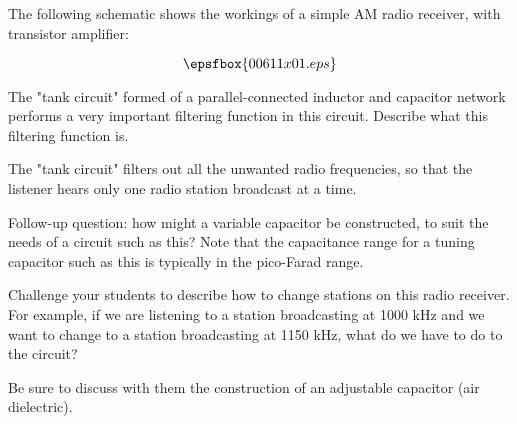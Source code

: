 

The following schematic shows the workings of a simple AM radio receiver, with transistor amplifier:

$$\epsfbox{00611x01.eps}$$

The "tank circuit" formed of a parallel-connected inductor and capacitor network performs a very important filtering function in this circuit.  Describe what this filtering function is.







The "tank circuit" filters out all the unwanted radio frequencies, so that the listener hears only one radio station broadcast at a time.

\vskip 10pt

Follow-up question: how might a variable capacitor be constructed, to suit the needs of a circuit such as this?  Note that the capacitance range for a tuning capacitor such as this is typically in the pico-Farad range.







Challenge your students to describe how to change stations on this radio receiver.  For example, if we are listening to a station broadcasting at 1000 kHz and we want to change to a station broadcasting at 1150 kHz, what do we have to do to the circuit?

Be sure to discuss with them the construction of an adjustable capacitor (air dielectric).




